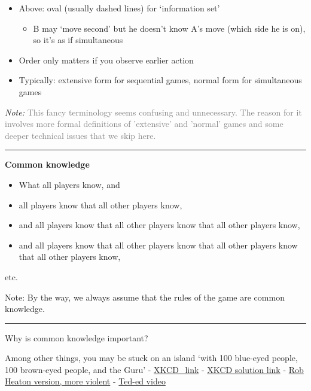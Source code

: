 \documentclass[]{article}
\providecommand{\tightlist}{%
  \setlength{\itemsep}{0pt}\setlength{\parskip}{0pt}}
\begin{document}
\begin{itemize}
\tightlist
\item
  Above: oval (usually dashed lines) for `information set'

  \begin{itemize}
  \tightlist
  \item
    B may `move second' but he doesn't know A's move (which side he is on), so it's as if simultaneous
  \end{itemize}
\item
  Order only matters if you observe earlier action
\item
  Typically: extensive form for sequential games, normal form for simultaneous games
\end{itemize}

\emph{Note:} \textcolor{gray}{This fancy terminology seems confusing and unnecessary.  The reason for it involves more formal definitions of 'extensive' and 'normal' games and some deeper technical issues that we skip here.}

\begin{center}\rule{0.5\linewidth}{\linethickness}\end{center}

\textbf{Common knowledge}

\begin{itemize}
\tightlist
\item
  What all players know, and
\item
  all players know that all other players know,
\item
  and all players know that all other players know that all other players know,
\item
  and all players know that all other players know that all other players know that all other players know,
\end{itemize}

etc.

Note: By the way, we always assume that the rules of the game are common knowledge.

\begin{center}\rule{0.5\linewidth}{\linethickness}\end{center}

Why is common knowledge important?

Among other things, you may be stuck on an island `with 100 blue-eyed people, 100 brown-eyed people, and the Guru'
- \href{https://xkcd.com/blue_eyes.html}{XKCD\_link}
- \href{https://xkcd.com/solution.html}{XKCD solution link}
- \href{http://robertheaton.com/2014/01/06/how-to-win-at-dinner-party-the-blue-eyed-islanders/}{Rob Heaton version, more violent}
- \href{http://ed.ted.com/lessons/the-famously-difficult-green-eyed-logic-puzzle-alex-gendler}{Ted-ed video}
\end{document}
